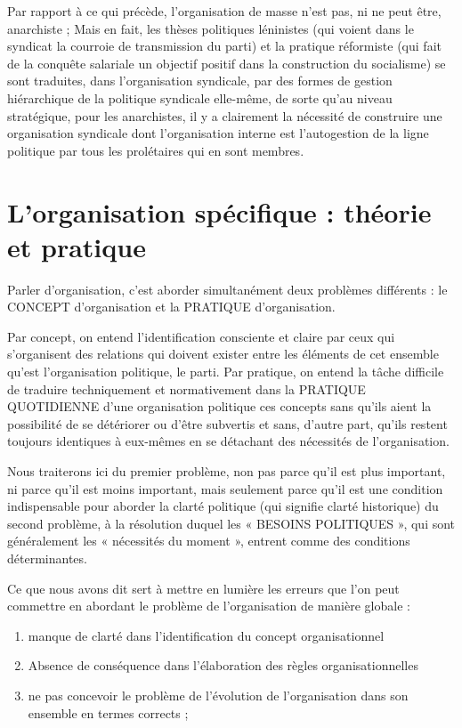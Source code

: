 Par rapport à ce qui précède, l'organisation de masse n'est pas, ni ne peut être, anarchiste ; Mais en fait, les thèses politiques léninistes (qui voient dans le syndicat la courroie de transmission du parti) et la pratique réformiste (qui fait de la conquête salariale un objectif positif dans la construction du socialisme) se sont traduites, dans l'organisation syndicale, par des formes de gestion hiérarchique de la politique syndicale elle-même, de sorte qu'au niveau stratégique, pour les anarchistes, il y a clairement la nécessité de construire une organisation syndicale dont l'organisation interne est l'autogestion de la ligne politique par tous les prolétaires qui en sont membres.

\chapter{L'organisation spécifique : théorie et pratique}\hypertarget{lorganisation-spcifique--thorie-et-pratique}{}\label{lorganisation-spcifique--thorie-et-pratique}

Parler d'organisation, c'est aborder simultanément deux problèmes différents : le CONCEPT d'organisation et la PRATIQUE d'organisation.

Par concept, on entend l'identification consciente et claire par ceux qui s'organisent des relations qui doivent exister entre les éléments de cet ensemble qu'est l'organisation politique, le parti. Par pratique, on entend la tâche difficile de traduire techniquement et normativement dans la PRATIQUE QUOTIDIENNE d'une organisation politique ces concepts sans qu'ils aient la possibilité de se détériorer ou d'être subvertis et sans, d'autre part, qu'ils restent toujours identiques à eux-mêmes en se détachant des nécessités de l'organisation.

Nous traiterons ici du premier problème, non pas parce qu'il est plus important, ni parce qu'il est moins important, mais seulement parce qu'il est une condition indispensable pour aborder la clarté politique (qui signifie clarté historique) du second problème, à la résolution duquel les « BESOINS POLITIQUES », qui sont généralement les « nécessités du moment », entrent comme des conditions déterminantes.

Ce que nous avons dit sert à mettre en lumière les erreurs que l'on peut commettre en abordant le problème de l'organisation de manière globale :

\begin{enumerate}
\item{} manque de clarté dans l'identification du concept organisationnel
\item{} Absence de conséquence dans l'élaboration des règles organisationnelles
\item{} ne pas concevoir le problème de l'évolution de l'organisation dans son ensemble en termes corrects ;
\end{enumerate}


